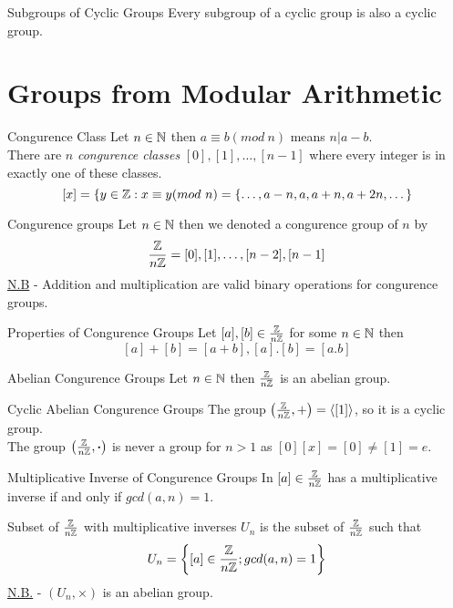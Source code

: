 \documentclass[11pt,a4paper]{article}
\begin{document}
\subtitle{Theorem 7.06 - }{Subgroups of Cyclic Groups}
Every subgroup of a cyclic group is also a cyclic group.\\

\section{Groups from Modular Arithmetic}

\subtitle{Definition 8.01 - }{Congurence Class}
Let $n \in \mathbb{N}$ then $a \equiv b (mod\ n)$ means $n | a - b$.\\
There are $n$ \textit{congurence classes} $[0], [1], \dots , [n-1]$ where every integer is in exactly one of these classes.
$$[x] = \{y \in \mathbb{Z} : x \equiv y (mod\ n) = \{ \dots , a-n , a , a+n , a+2n , \dots\}$$

\subtitle{Definition 8.02 - }{Congurence groups}
Let $n \in \mathbb{N}$ then we denoted a congurence group of $n$ by
$$\frac{\mathbb{Z}}{n\mathbb{Z}} = {[0], [1] , \dots , [n-2] , [n-1]}$$
\underline{N.B} - Addition and multiplication are valid binary operations for congurence groups.\\

\subtitle{Definition 8.03 - }{Properties of Congurence Groups}
Let $[a], [b] \in \frac{\mathbb{Z}}{n\mathbb{Z}}$ for some $n \in \mathbb{N}$ then
$$[a] + [b] = [a + b], [a].[b] = [a.b]$$

\subtitle{Theorem 8.04 - }{Abelian Congurence Groups}
Let $n \in \mathbb{N}$ then $\frac{\mathbb{Z}}{n\mathbb{Z}}$ is an abelian group.\\

\subtitle{Theorem 8.05 - }{Cyclic Abelian Congurence Groups}
The group $\left( \frac{\mathbb{Z}}{n\mathbb{Z}}, + \right) = \langle [1] \rangle$, so it is a cyclic group.\\
The group $\left( \frac{\mathbb{Z}}{n\mathbb{Z}}, \boldsymbol{\cdot} \right)$ is never a group for $n > 1$ as $[0][x] = [0] \not = [1] = e$.\\

\subtitle{Theorem 8.06 - }{Multiplicative Inverse of Congurence Groups}
In $[a] \in \frac{\mathbb{Z}}{n\mathbb{Z}}$ has a multiplicative inverse if and only if $gcd(a, n) = 1$.\\

\subtitle{Definition 8.07 - }{Subset of $\frac{\mathbb{Z}}{n\mathbb{Z}}$ with multiplicative inverses}
$U_n$ is the subset of $\frac{\mathbb{Z}}{n\mathbb{Z}}$ such that
$$U_n = \left\{ [a] \in \frac{\mathbb{Z}}{n\mathbb{Z}}; gcd(a, n) = 1 \right\}$$
\underline{N.B.} - $(U_n, \times)$ is an abelian group.
\end{document}
